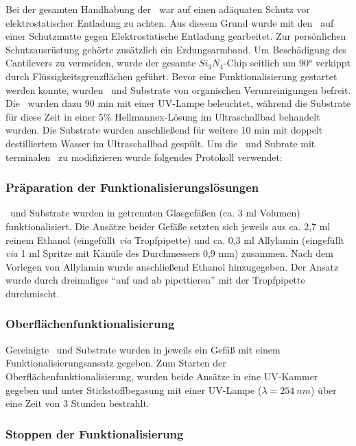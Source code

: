 Bei der gesamten Handhabung der \spitzen~war auf einen adäquaten Schutz vor elektrostatischer Entladung zu achten. Aus diesem Grund wurde mit den \spitzen~auf einer Schutzmatte gegen Elektrostatische Entladung gearbeitet. Zur persönlichen Schutzausrüstung gehörte zusätzlich ein Erdungsarmband. Um Beschädigung des Cantilevers zu vermeiden, wurde der gesamte $Si_3N_4$-Chip seitlich um 90° verkippt durch Flüssigkeitsgrenzflächen geführt. Bevor eine Funktionalisierung gestartet werden konnte, wurden \spitzen~und Substrate von organischen Verunreinigungen befreit. Die \spitzen~wurden dazu 90 min mit einer UV-Lampe beleuchtet, während die Substrate für diese Zeit in einer 5\% Hellmannex-Lösung im Ultraschallbad behandelt wurden. Die Substrate wurden anschließend für weitere 10 min mit doppelt destilliertem Wasser im Ultraschallbad gespült. Um die \spitzen~und Subrate mit terminalen \aminos~zu modifizieren wurde folgendes Protokoll verwendet:

\subsubsection{Präparation der Funktionalisierungslösungen}
\label{subsubsec:präparation_der_funktionalisierungslösungen}

\spitzen~und Substrate wurden in getrennten Glasgefäßen (ca. 3 ml Volumen) funktionalisiert. Die Ansätze beider Gefäße setzten sich jeweils aus ca. 2,7 ml reinem Ethanol (eingefüllt \textit{via} Tropfpipette) und ca. 0,3 ml Allylamin (eingefüllt \textit{via} 1 ml Spritze mit Kanüle des Durchmessers 0,9 mm) zusammen. Nach dem Vorlegen von Allylamin wurde anschließend Ethanol hinzugegeben. Der Ansatz wurde durch dreimaliges \enquote{auf und ab pipettieren} mit der Tropfpipette durchmischt.

\subsubsection{Oberflächenfunktionalisierung}
\label{subsubse:oberflächenfunktionalisierung}

Gereinigte \spitzen~und Substrate wurden in jeweils ein Gefäß mit einem Funktionalisierungsansatz gegeben. Zum Starten der Oberflächenfunktionalisierung, wurden beide Ansätze in eine UV-Kammer gegeben und unter Stickstoffbegasung mit einer UV-Lampe ($\lambda = 254~nm$) über eine Zeit von 3 Stunden bestrahlt.

\subsubsection{Stoppen der Funktionalisierung}
\label{subsubsec:stoppen_der_oberflächenfunktionalisierung}

